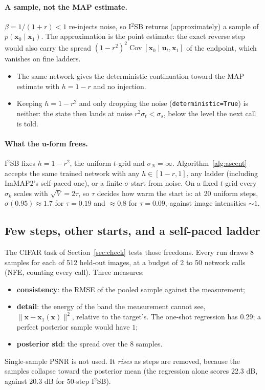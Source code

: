 \documentclass[11pt]{article}
\theoremstyle{remark}
\newcommand{\x}{\bm{x}}
\newcommand{\uu}{\bm{u}}
\newcommand{\code}[1]{\texttt{#1}}
\begin{document}
\paragraph{A sample, not the MAP estimate.} $\beta = 1/(1+r)<1$ re-injects noise, so I$^2$SB
returns (approximately) a sample of $p(\x_0\mid\x_1)$. The approximation is the point estimate:
the exact reverse step would also carry the spread $(1-r^2)^2\operatorname{Cov}[\x_0\mid\uu_t,
\x_1]$ of the endpoint, which vanishes on fine ladders.
\begin{itemize}[leftmargin=1.5em, itemsep=1pt]
  \item The same network gives the deterministic continuation toward the MAP estimate with
        $h = 1-r$ and no injection.
  \item Keeping $h = 1-r^2$ and only dropping the noise (\code{deterministic=True}) is neither:
        the state then lands at noise $r^2\sigma_t < \sigma_s$, below the level the next call is
        told.
\end{itemize}

\paragraph{What the $\uu$-form frees.} I$^2$SB fixes $h=1-r^2$, the uniform $t$-grid and
$\sigma_N=\infty$. Algorithm~\ref{alg:ascent} accepts the same trained network with any
$h\in[1-r,1]$, any ladder (including ImMAP2's self-paced one), or a finite-$\sigma$ start from
noise. On a fixed $t$-grid every $\sigma_k$ scales with $\sqrt V = 2\tau$, so $\tau$ decides how
warm the start is: at 20 uniform steps, $\sigma(0.95)\approx1.7$ for $\tau=0.19$ and
$\approx0.8$ for $\tau=0.09$, against image intensities $\sim1$.

\subsection{Few steps, other starts, and a self-paced ladder}\label{sec:sweep}

The CIFAR task of Section~\ref{sec:check} tests those freedoms. Every run draws 8 samples for
each of 512 held-out images, at a budget of 2 to 50 network calls (NFE, counting every call).
Three measures:
\begin{itemize}[leftmargin=1.5em, itemsep=1pt]
  \item \textbf{consistency}: the RMSE of the pooled sample against the measurement;
  \item \textbf{detail}: the energy of the band the measurement cannot see,
        $\|\x-\x_1(\x)\|^2$, relative to the target's. The one-shot regression has $0.29$; a
        perfect posterior sample would have $1$;
  \item \textbf{posterior std}: the spread over the 8 samples.
\end{itemize}
Single-sample PSNR is not used. It \emph{rises} as steps are removed, because the samples
collapse toward the posterior mean (the regression alone scores 22.3 dB, against 20.3 dB for
50-step I$^2$SB).
\end{document}
